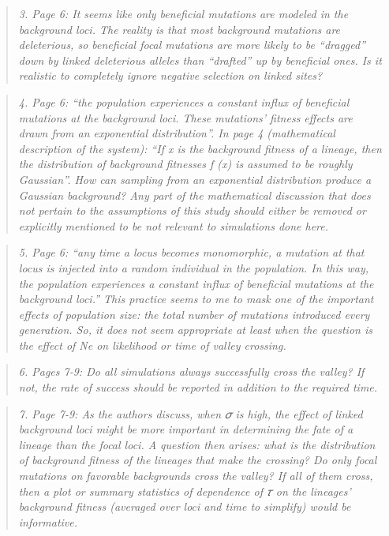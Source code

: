 \documentclass[11pt]{article}
\newenvironment{reviewerquote}{\begin{quote}\color{black}\itshape}{\end{quote}}
\begin{document}
\begin{reviewerquote}
3. Page 6: It seems like only beneficial mutations are modeled in the background loci. The reality is that most background mutations are deleterious, so beneficial focal mutations are more likely to be “dragged” down by linked deleterious alleles than “drafted” up by beneficial ones. Is it realistic to completely ignore negative selection on linked sites?
\end{reviewerquote}

\begin{reviewerquote}
4. Page 6: “the population experiences a constant influx of beneficial mutations at the background loci. These mutations’ fitness effects are drawn from an exponential distribution”. In page 4 (mathematical description of the system): “If x is the background fitness of a lineage, then the distribution of background fitnesses f (x) is assumed to be roughly Gaussian”. How can sampling from an exponential distribution produce a Gaussian background? Any part of the mathematical discussion that does not pertain to the assumptions of this study should either be removed or explicitly mentioned to be not relevant to simulations done here.
\end{reviewerquote}

\begin{reviewerquote}
5. Page 6: “any time a locus becomes monomorphic, a mutation at that locus is injected into a random individual in the population. In this way, the population experiences a constant influx of beneficial mutations at the background loci.” This practice seems to me to mask one of the important effects of population size: the total number of mutations introduced every generation. So, it does not seem appropriate at least when the question is the effect of Ne on likelihood or time of valley crossing.
\end{reviewerquote}

\begin{reviewerquote}
6. Pages 7-9: Do all simulations always successfully cross the valley? If not, the rate of success should be reported in addition to the required time.
\end{reviewerquote}

\begin{reviewerquote}
7. Page 7-9: As the authors discuss, when 𝜎 is high, the effect of linked background loci might be more important in determining the fate of a lineage than the focal loci. A question then arises: what is the distribution of background fitness of the lineages that make the crossing? Do only focal mutations on favorable backgrounds cross the valley? If all of them cross, then a plot or summary statistics of dependence of 𝜏 on the lineages’ background fitness (averaged over loci and time to simplify) would be informative.
\end{reviewerquote}
\end{document}
